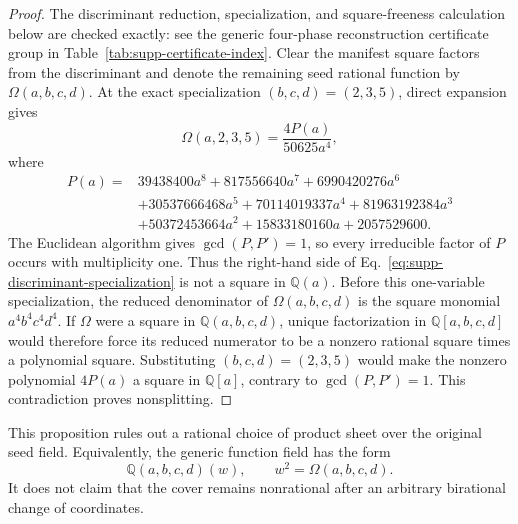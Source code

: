 \documentclass[aps,prx,reprint,nofootinbib,twoside,superscriptaddress,longbibliography,floatfix]{revtex4-2}
\theoremstyle{definition}
\begin{document}
\begin{proof}
The discriminant reduction, specialization, and square-freeness calculation below are checked exactly: see the generic four-phase reconstruction certificate group in Table~\ref{tab:supp-certificate-index}.
Clear the manifest square factors from the discriminant and denote the remaining seed rational function by $\Omega(a,b,c,d)$.  At the exact specialization $(b,c,d)=(2,3,5)$, direct expansion gives
\begin{equation}
\Omega(a,2,3,5)=\frac{4P(a)}{50625a^4},
\label{eq:supp-discriminant-specialization}
\end{equation}
where
\begin{equation}
\begin{aligned}
P(a)={}&39438400a^8+817556640a^7+6990420276a^6\\
&+30537666468a^5+70114019337a^4+81963192384a^3\\
&+50372453664a^2+15833180160a+2057529600.
\end{aligned}
\label{eq:supp-discriminant-polynomial}
\end{equation}
The Euclidean algorithm gives $\gcd(P,P')=1$, so every irreducible factor of $P$ occurs with multiplicity one.  Thus the right-hand side of Eq.~\eqref{eq:supp-discriminant-specialization} is not a square in $\mathbb Q(a)$.  Before this one-variable specialization, the reduced denominator of $\Omega(a,b,c,d)$ is the square monomial $a^4b^4c^4d^4$.  If $\Omega$ were a square in $\mathbb Q(a,b,c,d)$, unique factorization in $\mathbb Q[a,b,c,d]$ would therefore force its reduced numerator to be a nonzero rational square times a polynomial square.  Substituting $(b,c,d)=(2,3,5)$ would make the nonzero polynomial $4P(a)$ a square in $\mathbb Q[a]$, contrary to $\gcd(P,P')=1$.  This contradiction proves nonsplitting.
\end{proof}

{This proposition rules out a rational choice of product sheet over the original seed field. Equivalently, the generic function field has the form}
\begin{equation}
{\mathbb Q(a,b,c,d)(w),\qquad w^2=\Omega(a,b,c,d).}
\label{eq:supp-double-cover-field}
\end{equation}
{It does not claim that the cover remains nonrational after an arbitrary birational change of coordinates.}
\end{document}
